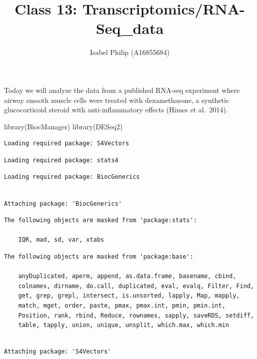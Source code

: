 \documentclass[
  letterpaper,
  DIV=11,
  numbers=noendperiod]{scrartcl}
\title{Class 13: Transcriptomics/RNA-Seq\_data}
\author{Isabel Philip (A16855684)}
\date{}
\newenvironment{Shaded}{\begin{snugshade}}{\end{snugshade}}
\newcommand{\FunctionTok}[1]{\textcolor[rgb]{0.28,0.35,0.67}{#1}}
\newcommand{\NormalTok}[1]{\textcolor[rgb]{0.00,0.23,0.31}{#1}}
\begin{document}
\maketitle


Today we will analyze the data from a published RNA-seq experiment where
airway smooth muscle cells were treated with dexamethasone, a synthetic
glucocorticoid steroid with anti-inflammatory effects (Himes et
al.~2014).

\begin{Shaded}
\begin{Highlighting}[]
\FunctionTok{library}\NormalTok{(BiocManager)}
\FunctionTok{library}\NormalTok{(DESeq2)}
\end{Highlighting}
\end{Shaded}

\begin{verbatim}
Loading required package: S4Vectors
\end{verbatim}

\begin{verbatim}
Loading required package: stats4
\end{verbatim}

\begin{verbatim}
Loading required package: BiocGenerics
\end{verbatim}

\begin{verbatim}

Attaching package: 'BiocGenerics'
\end{verbatim}

\begin{verbatim}
The following objects are masked from 'package:stats':

    IQR, mad, sd, var, xtabs
\end{verbatim}

\begin{verbatim}
The following objects are masked from 'package:base':

    anyDuplicated, aperm, append, as.data.frame, basename, cbind,
    colnames, dirname, do.call, duplicated, eval, evalq, Filter, Find,
    get, grep, grepl, intersect, is.unsorted, lapply, Map, mapply,
    match, mget, order, paste, pmax, pmax.int, pmin, pmin.int,
    Position, rank, rbind, Reduce, rownames, sapply, saveRDS, setdiff,
    table, tapply, union, unique, unsplit, which.max, which.min
\end{verbatim}

\begin{verbatim}

Attaching package: 'S4Vectors'
\end{verbatim}
\end{document}
